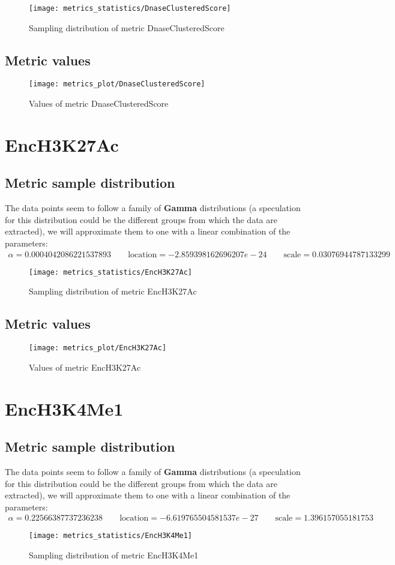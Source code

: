 \documentclass[\main/main.tex]{subfiles}
\begin{document}
\begin{figure}
  \texttt{[image: metrics\_statistics/DnaseClusteredScore]}
  \caption{Sampling distribution of metric DnaseClusteredScore}
\end{figure}
\subsection{Metric values}
\begin{figure}
  \texttt{[image: metrics\_plot/DnaseClusteredScore]}
  \caption{Values of metric DnaseClusteredScore}
\end{figure}

\clearpage
\section{EncH3K27Ac}
\subsection{Metric sample distribution}
The data points seem to follow a family of \textbf{Gamma} distributions (a speculation for this distribution could be the different groups from which the data are extracted), we will approximate them to one with a linear combination of the parameters:
\begin{align*}
  \alpha   = 0.0004042086221537893    \qquad  \text{location} = -2.859398162696207e-24 \qquad \text{scale} = 0.03076944787133299
\end{align*}
\begin{figure}
  \texttt{[image: metrics\_statistics/EncH3K27Ac]}
  \caption{Sampling distribution of metric EncH3K27Ac}
\end{figure}
\subsection{Metric values}
\begin{figure}
  \texttt{[image: metrics\_plot/EncH3K27Ac]}
  \caption{Values of metric EncH3K27Ac}
\end{figure}

\clearpage
\section{EncH3K4Me1}
\subsection{Metric sample distribution}
The data points seem to follow a family of \textbf{Gamma} distributions (a speculation for this distribution could be the different groups from which the data are extracted), we will approximate them to one with a linear combination of the parameters:
\begin{align*}
  \alpha   = 0.22566387737236238    \qquad  \text{location} = -6.619765504581537e-27 \qquad \text{scale} = 1.396157055181753
\end{align*}
\begin{figure}
  \texttt{[image: metrics\_statistics/EncH3K4Me1]}
  \caption{Sampling distribution of metric EncH3K4Me1}
\end{figure}
\end{document}
